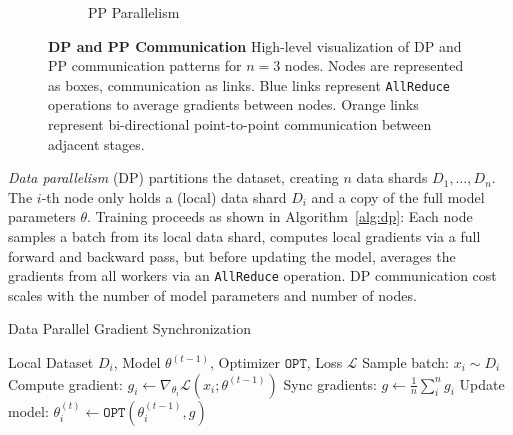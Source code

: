 \documentclass{article}
\begin{document}
\begin{figure}[ht]
\begin{subfigure}[b]{0.22\textwidth}
        \caption{PP Parallelism}
    \end{subfigure}
    \caption{\textbf{DP and PP Communication} High-level visualization of DP and
    PP communication patterns for $n=3$ nodes. Nodes are represented as boxes,
    communication as links. {\color{bblue} Blue links} represent
    \texttt{AllReduce} operations to average gradients between nodes. 
    {\color{oorange}Orange links} represent bi-directional point-to-point
    communication between adjacent stages.}
    \label{fig:dp-pp}
\end{figure}

\textit{Data parallelism} (DP) partitions the dataset, creating $n$ data shards
$D_1,\dots,D_n$. The $i$-th node only holds a (local) data shard $D_i$ and a
copy of the full model parameters $\theta$. Training proceeds as shown in
Algorithm~\ref{alg:dp}: Each node samples a batch from its local data shard,
computes local gradients via a full forward and backward pass, but before
updating the model, averages the gradients from all workers via an
\texttt{AllReduce} operation. DP communication cost scales with the number of
model parameters and number of nodes.

\begin{algorithm}
\caption{Data Parallel Gradient Synchronization}
\label{alg:dp}
\begin{algorithmic}
 Local Dataset $D_i$, Model $\theta^{(t-1)}$, Optimizer $\mathtt{OPT}$, Loss $\mathcal{L}$
\STATE Sample batch: $x_i\sim D_i$
\STATE Compute gradient: $g_i \gets \nabla_{\theta_i} \mathcal{L}(x_i; \theta^{(t-1)})$
\STATE Sync gradients: $g \gets \frac{1}{n}\sum_{i}^n g_i$ 
\STATE Update model: $\theta_i^{(t)} \gets \mathtt{OPT}(\theta_i^{(t-1)}, g)$
\end{algorithmic}
\end{algorithm}
\end{document}
